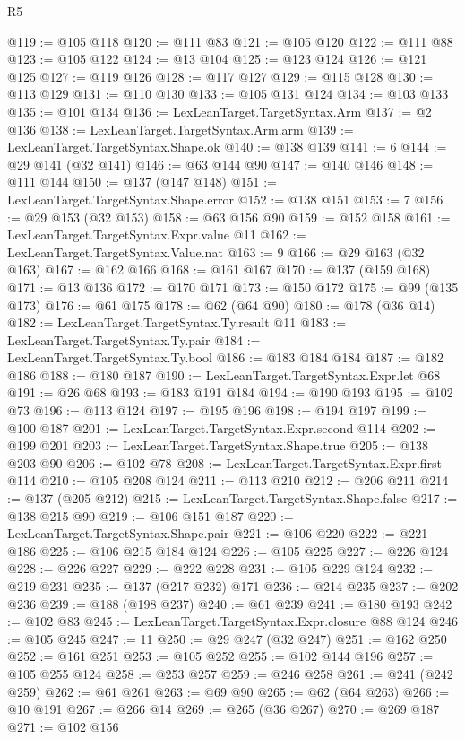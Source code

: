\begin{lexlean}{R5}
\begin{coremodule}
{{{{{{{{{{{{{{{{{{{{{{{{{{{{{{{{{{{{{{{{{{{{{{{{{{{{{{{{{{{{{{{{{{{{{{{{{{{{{{{{{{{{@119 := @105 @118
@120 := @111 @83
@121 := @105 @120
@122 := @111 @88
@123 := @105 @122
@124 := @13 @104
@125 := @123 @124
@126 := @121 @125
@127 := @119 @126
@128 := @117 @127
@129 := @115 @128
@130 := @113 @129
@131 := @110 @130
@133 := @105 @131 @124
@134 := @103 @133
@135 := @101 @134
@136 := LexLeanTarget.TargetSyntax.Arm
@137 := @2 @136
@138 := LexLeanTarget.TargetSyntax.Arm.arm
@139 := LexLeanTarget.TargetSyntax.Shape.ok
@140 := @138 @139
@141 := 6
@144 := @29 @141 (@32 @141)
@146 := @63 @144 @90
@147 := @140 @146
@148 := @111 @144
@150 := @137 (@147 @148)
@151 := LexLeanTarget.TargetSyntax.Shape.error
@152 := @138 @151
@153 := 7
@156 := @29 @153 (@32 @153)
@158 := @63 @156 @90
@159 := @152 @158
@161 := LexLeanTarget.TargetSyntax.Expr.value @11
@162 := LexLeanTarget.TargetSyntax.Value.nat
@163 := 9
@166 := @29 @163 (@32 @163)
@167 := @162 @166
@168 := @161 @167
@170 := @137 (@159 @168)
@171 := @13 @136
@172 := @170 @171
@173 := @150 @172
@175 := @99 (@135 @173)
@176 := @61 @175
@178 := @62 (@64 @90)
@180 := @178 (@36 @14)
@182 := LexLeanTarget.TargetSyntax.Ty.result @11
@183 := LexLeanTarget.TargetSyntax.Ty.pair
@184 := LexLeanTarget.TargetSyntax.Ty.bool
@186 := @183 @184 @184
@187 := @182 @186
@188 := @180 @187
@190 := LexLeanTarget.TargetSyntax.Expr.let @68
@191 := @26 @68
@193 := @183 @191 @184
@194 := @190 @193
@195 := @102 @73
@196 := @113 @124
@197 := @195 @196
@198 := @194 @197
@199 := @100 @187
@201 := LexLeanTarget.TargetSyntax.Expr.second @114
@202 := @199 @201
@203 := LexLeanTarget.TargetSyntax.Shape.true
@205 := @138 @203 @90
@206 := @102 @78
@208 := LexLeanTarget.TargetSyntax.Expr.first @114
@210 := @105 @208 @124
@211 := @113 @210
@212 := @206 @211
@214 := @137 (@205 @212)
@215 := LexLeanTarget.TargetSyntax.Shape.false
@217 := @138 @215 @90
@219 := @106 @151 @187
@220 := LexLeanTarget.TargetSyntax.Shape.pair
@221 := @106 @220
@222 := @221 @186
@225 := @106 @215 @184 @124
@226 := @105 @225
@227 := @226 @124
@228 := @226 @227
@229 := @222 @228
@231 := @105 @229 @124
@232 := @219 @231
@235 := @137 (@217 @232) @171
@236 := @214 @235
@237 := @202 @236
@239 := @188 (@198 @237)
@240 := @61 @239
@241 := @180 @193
@242 := @102 @83
@245 := LexLeanTarget.TargetSyntax.Expr.closure @88 @124
@246 := @105 @245
@247 := 11
@250 := @29 @247 (@32 @247)
@251 := @162 @250
@252 := @161 @251
@253 := @105 @252
@255 := @102 @144 @196
@257 := @105 @255 @124
@258 := @253 @257
@259 := @246 @258
@261 := @241 (@242 @259)
@262 := @61 @261
@263 := @69 @90
@265 := @62 (@64 @263)
@266 := @10 @191
@267 := @266 @14
@269 := @265 (@36 @267)
@270 := @269 @187
@271 := @102 @156
}}}}}}}}}}}}}}}}}}}}}}}}}}}}}}}}}}}}}}}}}}}}}}}}}}}}}}}}}}}}}}}}}}}}}}}}}}}}}}}}}}}}
\end{coremodule}
\end{lexlean}

